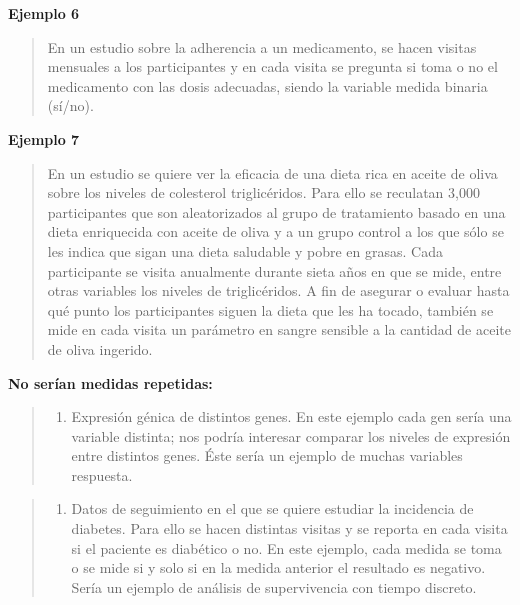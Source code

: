 \documentclass[
]{book}
\providecommand{\tightlist}{%
  \setlength{\itemsep}{0pt}\setlength{\parskip}{0pt}}
\begin{document}
\textbf{Ejemplo 6}

\begin{quote}
En un estudio sobre la adherencia a un medicamento, se hacen visitas mensuales a los participantes y en cada visita se pregunta si toma o no el medicamento con las dosis adecuadas, siendo la variable medida binaria (sí/no).
\end{quote}

\textbf{Ejemplo 7}

\begin{quote}
En un estudio se quiere ver la eficacia de una dieta rica en aceite de oliva sobre los niveles de colesterol triglicéridos.
Para ello se reculatan 3,000 participantes que son aleatorizados al grupo de tratamiento basado en una dieta enriquecida con aceite de oliva y a un grupo control a los que sólo se les indica que sigan una dieta saludable y pobre en grasas.
Cada participante se visita anualmente durante sieta años en que se mide, entre otras variables los niveles de triglicéridos. A fin de asegurar o evaluar hasta qué punto los participantes siguen la dieta que les ha tocado, también se mide en cada visita un parámetro en sangre sensible a la cantidad de aceite de oliva ingerido.
\end{quote}

\textbf{No serían medidas repetidas:}

\begin{quote}
\begin{enumerate}
\def\labelenumi{\arabic{enumi}.}
\tightlist
\item
  Expresión génica de distintos genes. En este ejemplo cada gen sería una variable distinta; nos podría interesar comparar los niveles de expresión entre distintos genes. Éste sería un ejemplo de muchas variables respuesta.
\end{enumerate}
\end{quote}

\begin{quote}
\begin{enumerate}
\def\labelenumi{\arabic{enumi}.}
\setcounter{enumi}{1}
\tightlist
\item
  Datos de seguimiento en el que se quiere estudiar la incidencia de diabetes. Para ello se hacen distintas visitas y se reporta en cada visita si el paciente es diabético o no. En este ejemplo, cada medida se toma o se mide si y solo si en la medida anterior el resultado es negativo. Sería un ejemplo de análisis de supervivencia con tiempo discreto.
\end{enumerate}
\end{quote}
\end{document}
